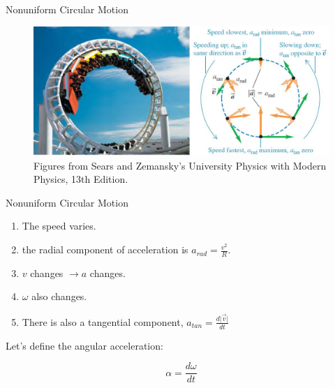 \documentclass[]{beamer}
\begin{document}
 \begin{frame}
Nonuniform Circular Motion

\vspace{5mm}


\begin{figure}[h!]  
    \includegraphics[width=1.\textwidth]{images/37.jpg}
    \caption{ {\tiny Figures from Sears and Zemansky's University Physics 
    with Modern Physics, 13th Edition.} }
  \end{figure}




    \end{frame}



 \begin{frame}
    Nonuniform Circular Motion
    
    
    
 \begin{enumerate}
    \item The speed varies.
    \item the radial component of acceleration is $a_{rad}=\frac{v^2}{R}$.
    \item  $v$ changes $\rightarrow a$ changes.
    \item $\omega$ also changes.
    \item There is also a tangential component, $a_{tan}=\frac{d\vert \vec v \vert}{d t}$
 \end{enumerate}
    
    \vspace{5mm}
    \pause
    Let's define the angular acceleration:

    \begin{equation}
        \alpha=\frac{d \omega}{d t}
    \end{equation}

        \end{frame}
    
\end{document}
